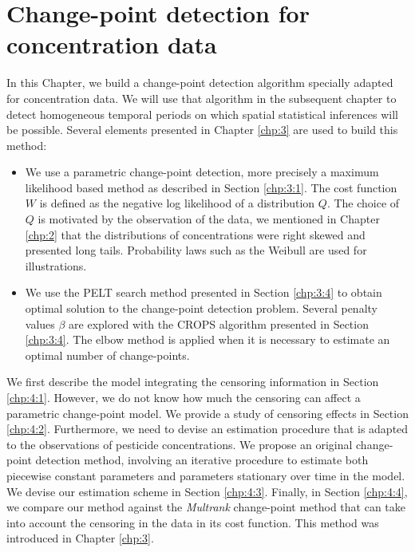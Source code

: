 \chapter{Change-point detection for concentration data}\label{chp:4}

\minitoc

\clearpage

In this Chapter, we build a change-point detection algorithm specially adapted for concentration data. We will use that algorithm in the subsequent chapter to detect homogeneous temporal periods on which spatial statistical inferences will be possible. Several elements presented in Chapter \ref{chp:3} are used to build this method:  
\begin{itemize}
\item We use a parametric change-point detection, more precisely a maximum likelihood based method as described in Section \ref{chp:3:1}. The cost function $W$ is defined as the negative log likelihood of a distribution $Q$. The choice of $Q$ is motivated by the observation of the data, we mentioned in Chapter \ref{chp:2} that the distributions of concentrations were right skewed and presented long tails. Probability laws such as the Weibull are used for illustrations.  
\item We use the PELT search method presented in Section \ref{chp:3:4} to obtain optimal solution to the change-point detection problem. Several penalty values $\beta$ are explored with the CROPS algorithm presented in Section \ref{chp:3:4}. The elbow method is applied when it is necessary to estimate an optimal number of change-points.   
\end{itemize}
We first describe the model integrating the censoring information in Section \ref{chp:4:1}. However, we do not know how much the censoring can affect a parametric change-point model. We provide a study of censoring effects in Section \ref{chp:4:2}. Furthermore, we need to devise an estimation procedure that is adapted to the observations of pesticide concentrations. We propose an original change-point detection method, involving an iterative procedure to estimate both piecewise constant parameters and parameters stationary over time in the model.
We devise our estimation scheme in Section \ref{chp:4:3}. Finally, in Section \ref{chp:4:4}, we compare our method against the \textit{Multrank} change-point method that can take into account the censoring in the data in its cost function. This method was introduced in Chapter \ref{chp:3}. 

